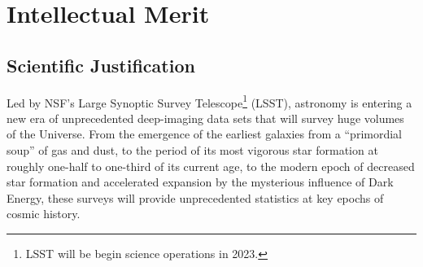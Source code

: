 \documentclass[oneside,11pt]{amsart}
\begin{document}


\noindent{}

\section{Intellectual Merit}
\label{sec:im}

\subsection{Scientific Justification} 

Led by NSF's Large Synoptic Survey Telescope\footnote{
%
LSST will be begin science operations in 2023.}
%
(LSST), astronomy is entering a new era of unprecedented deep-imaging
data sets that will survey huge volumes of the Universe.  From the
emergence of the earliest galaxies from a ``primordial soup'' of gas and
dust, to the period of its most vigorous star formation at roughly
one-half to one-third of its current age, to the modern epoch of
decreased star formation and accelerated expansion by the mysterious
influence of Dark Energy, these surveys will provide unprecedented
statistics at key epochs of cosmic history.
\end{document}
